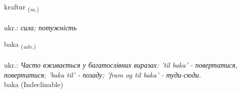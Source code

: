 \documentclass[frontgrid, backgrid]{flacards}\usepackage[]{graphicx}\usepackage[]{xcolor}
\begin{document}
\renewcommand{\flhead}{\vskip5pt \fboxsep=0pt {\small\bfseries\footnotesize Nafnorð | іменник}}
\renewcommand{\fcfoot}{\vskip5pt \fboxsep=0pt \hspace{2pt}{\small\bfseries\footnotesize 1K}}

\renewcommand{\blhead}{\vskip5pt {\small\bfseries\footnotesize Nafnorð | іменник }}
\renewcommand{\bcfoot}{\vskip5pt \hspace{2pt}{\small\bfseries\footnotesize 1K}}


{kraftur \small{\textsubscript{(\textit{m.})}} \\[1ex] %
\textphonetic{[kʰraftʏr]} \\
ukr.: \emph{сила; потужність} \\  [2ex]
\renewcommand*{\arraystretch}{0.8}
}


\renewcommand{\flhead}{\vskip5pt \fboxsep=0pt {\small\bfseries\footnotesize Atviksorð | прислівник}}
\renewcommand{\fcfoot}{\vskip5pt \fboxsep=0pt \hspace{2pt}{\small\bfseries\footnotesize 1K}}

\renewcommand{\blhead}{\vskip5pt {\small\bfseries\footnotesize Atviksorð | прислівник }}
\renewcommand{\bcfoot}{\vskip5pt \hspace{2pt}{\small\bfseries\footnotesize 1K}}


{baka \small{\textsubscript{(\textit{adv.})}} \\[1ex]
\textphonetic{[paːka]} \\
ukr.: \emph{Часто вживається у багатослівних виразах: 'til baka' - повертатися, повертатися; 'baka til' - позаду; 'fram og til baka' - туди-сюди.} \\  [2ex]
baka (Indeclinable)}
\end{document}
